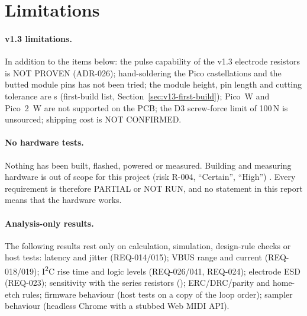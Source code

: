 \section{Limitations}
\label{sec:limitations}

\paragraph{v1.3 limitations.} In addition to the items below: the pulse capability
of the v1.3 electrode resistors is NOT PROVEN (ADR-026); hand-soldering the Pico
castellations and the butted module pins has not been tried; the module height,
pin length and cutting tolerance are s (first-build list,
Section~\ref{sec:v13-first-build}); Pico~W and Pico~2~W are not supported on the
PCB; the D3 screw-force limit of 100\,N is unsourced; shipping cost is NOT
CONFIRMED.

\paragraph{No hardware tests.} Nothing has been built, flashed, powered or
measured. Building and measuring hardware is out of scope for this project
(risk R-004, ``Certain'', ``High'') . Every
\lbl{[PHYSICAL]} requirement is therefore PARTIAL or NOT RUN, and no statement in
this report means that the hardware works.

\paragraph{Analysis-only results.} The following results rest only on
calculation, simulation, design-rule checks or host tests:
latency and jitter (REQ-014/015); VBUS range and current (REQ-018/019); I\textsuperscript{2}C
rise time and logic levels (REQ-026/041, REQ-024); electrode ESD (REQ-023);
sensitivity with the series resistors (); ERC/DRC/parity and
home-etch rules; firmware behaviour (host tests on a copy of the loop order);
sampler behaviour (headless Chrome with a stubbed Web MIDI API).

